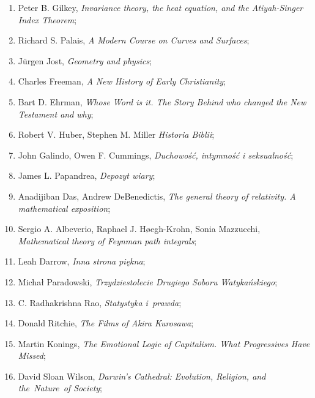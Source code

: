 \documentclass[a4paper,11pt]{article}
\begin{document}
\begin{enumerate}
\item Peter B. Gilkey, \textit{Invariance theory, the heat equation, and
    the Atiyah-Singer Index Theorem};

\item Richard S. Palais, \textit{A Modern Course on Curves and
    Surfaces};

\item J\"{u}rgen Jost, \textit{Geometry and physics};

\item Charles Freeman, \textit{A New History of Early Christianity};

\item Bart D. Ehrman, \textit{Whose Word is it. The Story Behind who
    changed the New Testament and why};

\item Robert V. Huber, Stephen M. Miller \textit{Historia Biblii};

\item John Galindo, Owen F. Cummings, \textit{Duchowość, intymność i
    seksualność};

\item James L. Papandrea, \textit{Depozyt wiary};

\item Anadijiban Das, Andrew DeBenedictis, \textit{The general theory of
    relativity. A mathematical exposition};

\item Sergio A. Albeverio, Raphael J. H\o egh-Krohn, Sonia Mazzucchi,
  \textit{Mathematical theory of Feynman path integrals};

\item Leah Darrow, \textit{Inna strona piękna};

\item Michał Paradowski, \textit{Trzydziestolecie Drugiego Soboru
    Watykańskiego};

\item C. Radhakrishna Rao, \textit{Statystyka i~prawda};

\item Donald Ritchie, \textit{The Films of Akira Kurosawa};

\item Martin Konings, \textit{The Emotional Logic of Capitalism. What
    Progressives Have Missed};

\item David Sloan Wilson, \textit{Darwin's Cathedral: Evolution,
    Religion, and the~Nature~of Society};


\end{enumerate}
\end{document}
